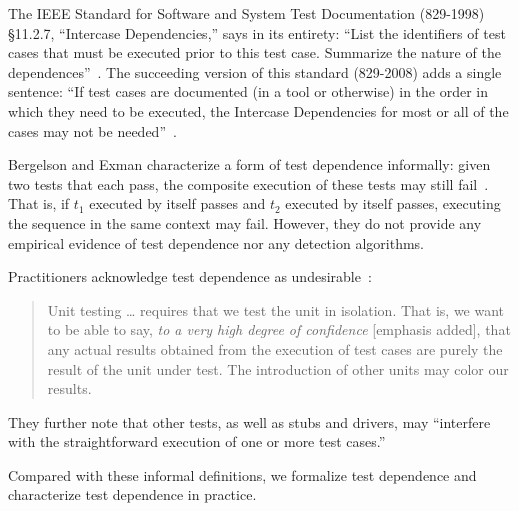 The IEEE Standard for Software and System Test
Documentation (829-1998) \S 11.2.7, ``Intercase
Dependencies,'' says in its entirety: ``List the identifiers of
test cases that must be executed prior to this test
case. Summarize
the nature of the dependences''~\cite{IEEE:829-1998}.  The succeeding version of this
standard (829-2008) adds a single sentence: ``If
test cases are documented (in a tool or otherwise) in the order in
which they need to be executed, the Intercase Dependencies for most or
all of the cases may not be needed''~\cite{IEEE:829-2008}.





Bergelson and Exman characterize a form of test dependence informally:
given two tests that each pass, the composite
execution of these tests may still
fail~\cite[p.~38]{bergelsonetal:EEE:2006}.  That is, if 
$t_1$ executed by itself passes and $t_2$ executed by itself passes,
executing the sequence  in the same context may fail.
However, they do not provide any empirical evidence of
test dependence nor any detection algorithms.

Practitioners acknowledge test dependence as undesirable~\cite{unit-test-def}:
\begin{quote}
Unit testing \dots  
requires that we test the unit in isolation. That is, we
want to be able to say, \emph{to a very high degree of confidence} [emphasis added], that
any actual results obtained from the execution of test cases are
purely the result of the unit under test. The introduction of
other units may color our results.
\end{quote}
They further note that other tests, as well as stubs and drivers,
may ``interfere with the straightforward
execution of one or more test cases.''


Compared with these informal definitions,
we formalize test dependence and characterize 
test dependence in practice.

